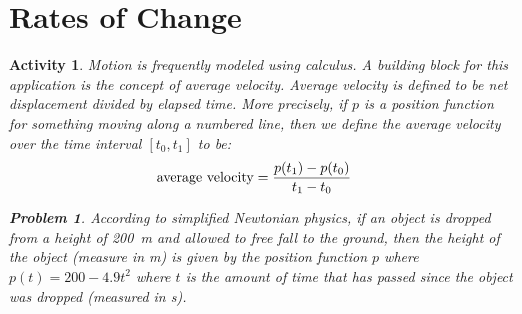 \documentclass[12pt]{article}
\theoremstyle{activity}
\newtheorem{activity}{Activity}
\newenvironment{intro}{}{}
\theoremstyle{problem}
\newtheorem{problem}{Problem}
\theoremstyle{example}
\theoremstyle{definition}
\theoremstyle{exercises}
\theoremstyle{exercise}
\begin{document}
\section{Rates of Change}
\begin{activity}{}

\begin{intro}
Motion is frequently modeled using calculus. A building block for this application is the concept of \emph{average velocity}. Average velocity is defined to be net displacement divided by elapsed time. More precisely, if $p$ is a position function for something moving along a numbered line, then we define the average velocity over the time interval $\left[t_0,t_1\right]$ to be: 
\begin{align}\label{ratesofchange:eq:avgvel}
\text{average velocity}
&=\frac{p\mleft(t_1\mright)-p\mleft(t_0\mright)}{t_1-t_0}
\end{align}
\end{intro}
%
\begin{problem}{}
According to simplified Newtonian physics, if an object is dropped from a height of \SI{200}{\meter} and allowed to free fall to the ground, then the height of the object (measure in \si{\meter}) is given by the position function $p$ where $p(t)=200-4.9t^2$ where $t$ is the amount of time that has passed since the object was dropped (measured in \si{\second}).


\end{problem}
\end{activity}
\end{document}
